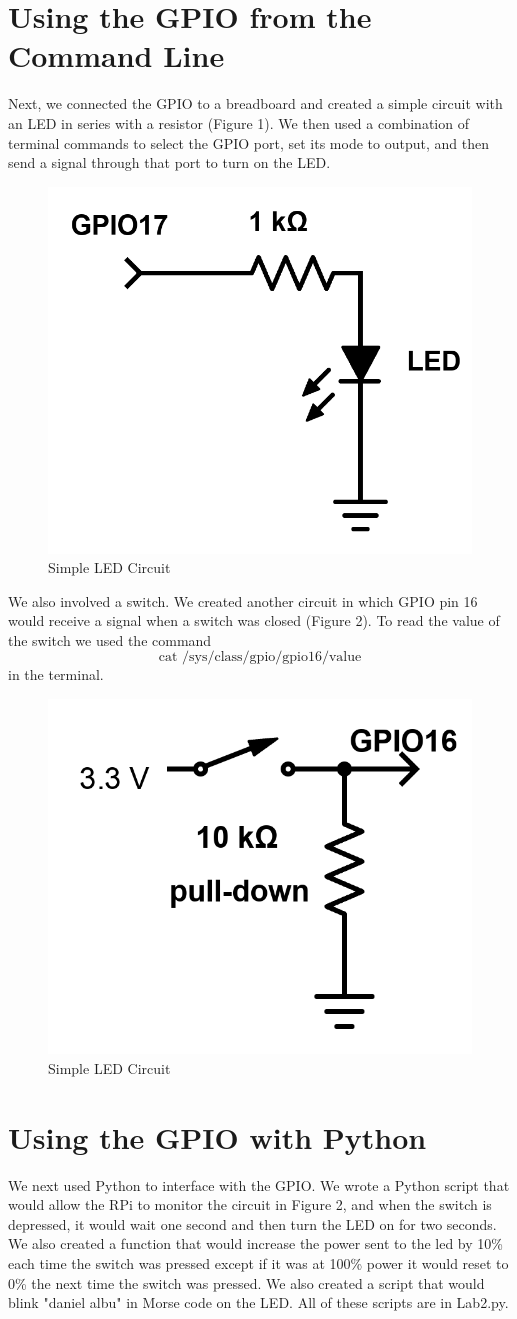 \documentclass{article}
\begin{document}
\section{Using the GPIO from the Command Line}
Next, we connected the GPIO to a breadboard and created a simple circuit with an LED in series with a resistor (Figure 1). We then used a combination of terminal commands to select the GPIO port, set its mode to output, and then send a signal through that port to turn on the LED.

\begin{figure}[h!]
    \centering
    \includegraphics[width=0.4\linewidth]{simple_led.png}
    \caption{Simple LED Circuit}
\end{figure}

We also involved a switch. We created another circuit in which GPIO pin 16 would receive a signal when a switch was closed (Figure 2). To read the value of the switch we used the command \[\text{cat /sys/class/gpio/gpio16/value}\] in the terminal.

\begin{figure}[h!]
    \centering
    \includegraphics[width=0.4\linewidth]{simple_switch.png}
    \caption{Simple LED Circuit}
\end{figure}


\section{Using the GPIO with Python}
We next used Python to interface with the GPIO. We wrote a Python script that would allow the RPi to monitor the circuit in Figure 2, and when the switch is depressed, it would wait one second and then turn the LED on for two seconds. We also created a function that would increase the power sent to the led by 10\% each time the switch was pressed except if it was at 100\% power it would reset to 0\% the next time the switch was pressed. We also created a script that would blink "daniel albu" in Morse code on the LED. All of these scripts are in Lab2.py.
\end{document}
